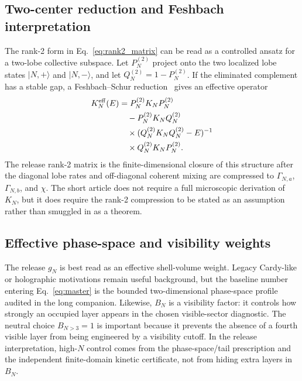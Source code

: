 \documentclass[pdflatex,sn-mathphys-num,iicol]{sn-jnl}
\begin{document}
\subsection{Two-center reduction and Feshbach interpretation}

The rank-2 form in Eq.~\eqref{eq:rank2_matrix} can be read as a controlled ansatz for a two-lobe collective subspace.
Let \(P_N^{(2)}\) project onto the two localized lobe states \(|N,+\rangle\) and \(|N,-\rangle\), and let \(Q_N^{(2)}=1-P_N^{(2)}\).
If the eliminated complement has a stable gap, a Feshbach--Schur reduction~\cite{Feshbach1958} gives an effective operator
\begin{equation}
    \begin{aligned}
    K_N^{\rm eff}(E)
    &=
    P_N^{(2)}K_NP_N^{(2)}
    \\
    &\quad
    -
    P_N^{(2)}K_NQ_N^{(2)}
    \\
    &\quad\times
    (Q_N^{(2)}K_NQ_N^{(2)}-E)^{-1}
    \\
    &\quad\times
    Q_N^{(2)}K_NP_N^{(2)}.
    \end{aligned}
    \label{eq:feshbach_rank2}
\end{equation}
The release rank-2 matrix is the finite-dimensional closure of this structure after the diagonal lobe rates and off-diagonal coherent mixing are compressed to \(\Gamma_{N,a}\), \(\Gamma_{N,b}\), and \(\chi\).
The short article does not require a full microscopic derivation of \(K_N\), but it does require the rank-2 compression to be stated as an assumption rather than smuggled in as a theorem.

\subsection{Effective phase-space and visibility weights}

The release \(g_N\) is best read as an effective shell-volume weight.
Legacy Cardy-like or holographic motivations remain useful background, but the baseline number entering Eq.~\eqref{eq:master} is the bounded two-dimensional phase-space profile audited in the long companion.
Likewise, \(B_N\) is a visibility factor: it controls how strongly an occupied layer appears in the chosen visible-sector diagnostic.
The neutral choice \(B_{N>3}=1\) is important because it prevents the absence of a fourth visible layer from being engineered by a visibility cutoff.
In the release interpretation, high-\(N\) control comes from the phase-space/tail prescription and the independent finite-domain kinetic certificate, not from hiding extra layers in \(B_N\).
\end{document}
